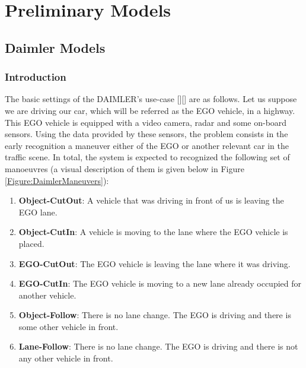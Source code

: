 \section{Preliminary Models}
\subsection{Daimler Models}

\subsubsection*{Introduction}

The basic settings of the DAIMLER's use-case [][] are as follows. Let us suppose we are driving our car, which will be referred as the EGO vehicle, in a highway. This EGO vehicle is equipped with a video camera, radar and some on-board sensors.  Using the data provided by these sensors, the problem consists in the early recognition a maneuver either of the EGO or another relevant car in the traffic scene. In total, the system is expected to recognized the following set of manoeuvres (a visual description of them is given below in Figure \ref{Figure:DaimlerManeuvers}):
\begin{enumerate}
\item \textbf{Object-CutOut}:  A vehicle that was driving in front of us is leaving the EGO lane.
\item \textbf{Object-CutIn}: A vehicle is moving to the lane where the EGO vehicle is placed.
\item \textbf{EGO-CutOut}: The EGO vehicle is leaving the lane where it was driving.
\item \textbf{EGO-CutIn}: The EGO vehicle is moving to a new lane already occupied for another vehicle. 
\item \textbf{Object-Follow}: There is no lane change. The EGO is driving and there is some other vehicle in front.
\item \textbf{Lane-Follow}: There is no lane change. The EGO is driving and there is not any other vehicle in front.
\end{enumerate}

